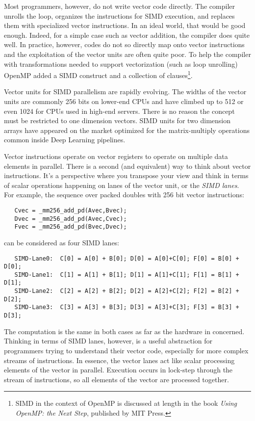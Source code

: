 Most programmers, however, do not write vector code directly.  The compiler unrolls the loop, organizes the instructions for SIMD
execution, and replaces them with specialized vector instructions.  In an ideal world, that would be good enough. Indeed,
for a simple case such as vector addition, the compiler does quite well.  In practice, however, codes do not so directly map
onto vector instructions and the exploitation of the vector units are often quite poor.
To help the compiler with transformations needed to support vectorization (such as loop unrolling) OpenMP added
a SIMD construct and a collection of clauses\footnote{SIMD in the context of OpenMP is discussed at length in the book
\emph{Using OpenMP: the Next Step}, published by MIT Press.}.

Vector units for SIMD parallelism are rapidly evolving.  The widths of the vector units are commonly 256 bits on lower-end
CPUs and have climbed up to 512 or even 1024 for CPUs used in high-end servers.  There is no reason the concept must 
be restricted to one dimension vectors.   SIMD units for two dimension arrays have appeared on the market optimized
for the matrix-multiply operations common inside Deep Learning pipelines. 

Vector instructions operate on vector registers to operate on multiple data elements in parallel. There is a second (and equivalent)
way to think about vector instructions.   It's a perspective where you transpose your view and think in terms of scalar operations
happening on lanes of the vector unit, or the \emph{SIMD lanes}.   For example, the sequence over packed doubles
with 256 bit vector instructions:
\begin{verbatim}
   Cvec = _mm256_add_pd(Avec,Bvec);
   Dvec = _mm256_add_pd(Avec,Cvec);
   Fvec = _mm256_add_pd(Bvec,Dvec);
\end{verbatim}
can be considered as four SIMD lanes:
\begin{verbatim}
   SIMD-Lane0:  C[0] = A[0] + B[0]; D[0] = A[0]+C[0]; F[0] = B[0] + D[0];
   SIMD-Lane1:  C[1] = A[1] + B[1]; D[1] = A[1]+C[1]; F[1] = B[1] + D[1];
   SIMD-Lane2:  C[2] = A[2] + B[2]; D[2] = A[2]+C[2]; F[2] = B[2] + D[2];
   SIMD-Lane3:  C[3] = A[3] + B[3]; D[3] = A[3]+C[3]; F[3] = B[3] + D[3];
\end{verbatim}
The computation is the same in both cases as far as the hardware in concerned.  Thinking in terms
of SIMD lanes, however, is a useful abstraction for programmers trying to understand their vector code,
especially for more complex streams of instructions.  In essence, the vector lanes act like scalar processing 
elements of the vector in parallel. Execution occurs in lock-step through the stream of instructions, so all elements of the
vector are processed together.
   
